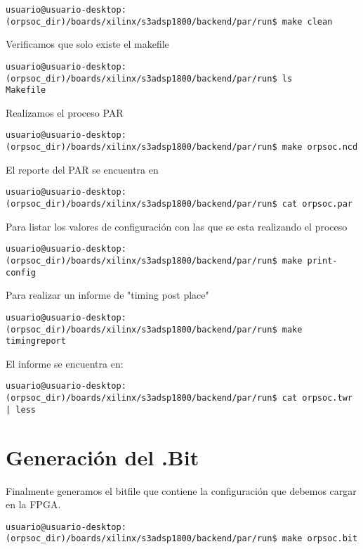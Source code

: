 \begin{verbatim}
usuario@usuario-desktop:(orpsoc_dir)/boards/xilinx/s3adsp1800/backend/par/run$ make clean
\end{verbatim}

Verificamos que solo existe el makefile
\begin{verbatim}
usuario@usuario-desktop:(orpsoc_dir)/boards/xilinx/s3adsp1800/backend/par/run$ ls
Makefile
\end{verbatim}

Realizamos el proceso PAR 

\begin{verbatim}
usuario@usuario-desktop:(orpsoc_dir)/boards/xilinx/s3adsp1800/backend/par/run$ make orpsoc.ncd
\end{verbatim}
El reporte del PAR se encuentra en 
\begin{verbatim}
usuario@usuario-desktop:(orpsoc_dir)/boards/xilinx/s3adsp1800/backend/par/run$ cat orpsoc.par
\end{verbatim}

Para listar los valores de configuración con las que se esta realizando el proceso
\begin{verbatim}
usuario@usuario-desktop:(orpsoc_dir)/boards/xilinx/s3adsp1800/backend/par/run$ make print-config
\end{verbatim}

Para realizar un informe de "timing post place" 

\begin{verbatim}
usuario@usuario-desktop:(orpsoc_dir)/boards/xilinx/s3adsp1800/backend/par/run$ make timingreport
\end{verbatim}

El informe se encuentra en:

\begin{verbatim}
usuario@usuario-desktop:(orpsoc_dir)/boards/xilinx/s3adsp1800/backend/par/run$ cat orpsoc.twr | less
\end{verbatim}


 \section{Generación del .Bit}

Finalmente generamos el bitfile que contiene la configuración que debemos cargar en la FPGA.

\begin{verbatim}
usuario@usuario-desktop:(orpsoc_dir)/boards/xilinx/s3adsp1800/backend/par/run$ make orpsoc.bit
\end{verbatim}

